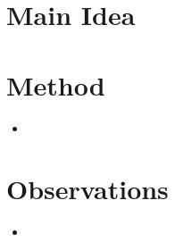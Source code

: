 \documentclass[12pt]{scrartcl}
\begin{document}
\title{}
\author{}
\date{}
\maketitle

\section{Main Idea}

\section{Method}
  \begin{itemize}
    \item 
  \end{itemize}

\section{Observations}
  \begin{itemize}
    \item 
  \end{itemize}



\end{document}
